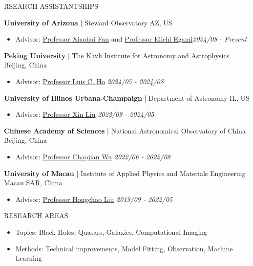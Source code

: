 \documentclass[11pt]{article} %
\begin{document}
\begin{section}{RSEARCH ASSISTANTSHIPS}

\textbf{University of Arizona} | Steward Observatory \hfill AZ, US 
\begin{itemize}[leftmargin=1.5em]
\item Advisor: \href{mailto:xfan@arizona.edu}{Professor Xiaohui Fan} and \href{mailto:egami@arizona.edu}{Professor Eiichi Egami}\hfill \textit{2024/08 - Present}
\end{itemize}

\textbf{Peking University} | The Kavli Institute for Astronomy and Astrophysics \hfill Beijing, China 
\begin{itemize}[leftmargin=1.5em]
\item Advisor: \href{mailto:lho.pku@gmail.com}{Professor Luis C. Ho} \hfill \textit{2024/05 - 2024/08}
\end{itemize}

\textbf{University of Illinos Urbana-Champaign} | Department of Astronomy \hfill IL, US 
\begin{itemize}[leftmargin=1.5em]
\item Advisor: \href{mailto:xinliuxl@illinois.edu}{Professor Xin Liu} \hfill \textit{2022/09 - 2024/05}
\end{itemize}

\textbf{Chinese Academy of Sciences} | National Astronomical Observatory of China \hfill Beijing, China 
\begin{itemize}[leftmargin=1.5em]
\item Advisor: \href{mailto:chjwu@bao.ac.cn}{Professor Chaojian Wu} \hfill \textit{2022/06 - 2022/08} 
\end{itemize}

\textbf{University of Macau} | Institute of Applied Physics and Materials Engineering \hfill Macau SAR, China
\begin{itemize}[leftmargin=1.5em]
\item Advisor: \href{mailto:hcliu@um.edu.mo}{Professor Hongchao Liu} \hfill \textit{2019/09 - 2022/05}
\end{itemize}

\end{section}

\begin{section}{RESEARCH AREAS}

\begin{itemize}[leftmargin=1.5em]
    \item Topics: Black Holes, Quasars, Galaxies, Computational Imaging
    \item Methods: Technical improvements, Model Fitting, Observation, Machine Learning 
\end{itemize}

\end{section}
\end{document}
